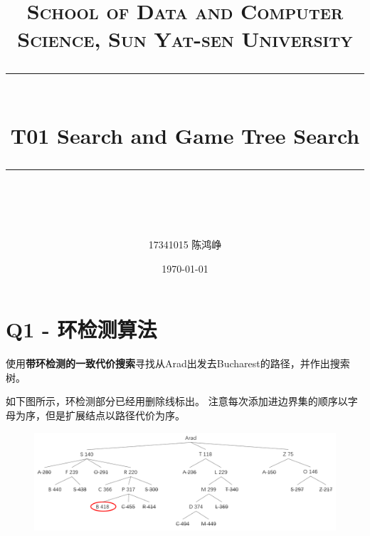 \documentclass[a4paper, 11pt]{article}
\title{	
\normalfont \normalsize
\textsc{School of Data and Computer Science, Sun Yat-sen University} \\ [25pt] %
\rule{\textwidth}{0.5pt} \\[0.4cm] %
\huge  T01 Search and Game Tree Search\\ %
\rule{\textwidth}{2pt} \\[0.5cm] %
\author{17341015 陈鸿峥}
\date{\normalsize\today}
}
\begin{document}
\maketitle
\tableofcontents
\newpage

\section{Q1 - 环检测算法}
\begin{question}
使用\textbf{带环检测的一致代价搜索}寻找从Arad出发去Bucharest的路径，并作出搜索树。
\end{question}
\begin{answer}
如下图所示，环检测部分已经用删除线标出。
注意每次添加进边界集的顺序以字母为序，但是扩展结点以路径代价为序。
\begin{figure}[H]
\centering
\includegraphics[width=\linewidth]{fig/A1.png}
\end{figure}
\end{answer}
\end{document}
